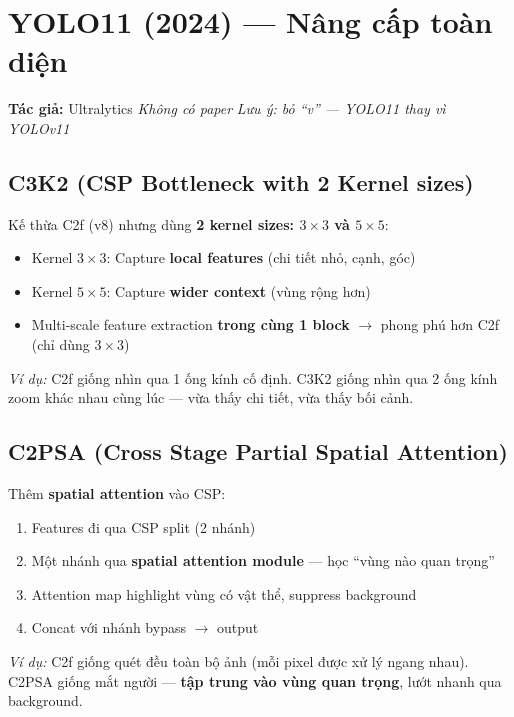 \section{YOLO11 (2024) --- Nâng cấp toàn diện}
\textbf{Tác giả:} Ultralytics \hfill \textit{Không có paper} \hfill \textit{Lưu ý: bỏ ``v'' --- YOLO11 thay vì YOLOv11}

\subsection{C3K2 (CSP Bottleneck with 2 Kernel sizes)}
Kế thừa C2f (v8) nhưng dùng \textbf{2 kernel sizes: $3\times3$ và $5\times5$}:
\begin{itemize}
    \item Kernel $3\times3$: Capture \textbf{local features} (chi tiết nhỏ, cạnh, góc)
    \item Kernel $5\times5$: Capture \textbf{wider context} (vùng rộng hơn)
    \item Multi-scale feature extraction \textbf{trong cùng 1 block} $\rightarrow$ phong phú hơn C2f (chỉ dùng $3\times3$)
\end{itemize}

\textit{Ví dụ:} C2f giống nhìn qua 1 ống kính cố định. C3K2 giống nhìn qua 2 ống kính zoom khác nhau cùng lúc --- vừa thấy chi tiết, vừa thấy bối cảnh.

\subsection{C2PSA (Cross Stage Partial Spatial Attention)}
Thêm \textbf{spatial attention} vào CSP:
\begin{enumerate}
    \item Features đi qua CSP split (2 nhánh)
    \item Một nhánh qua \textbf{spatial attention module} --- học ``vùng nào quan trọng''
    \item Attention map highlight vùng có vật thể, suppress background
    \item Concat với nhánh bypass $\rightarrow$ output
\end{enumerate}

\textit{Ví dụ:} C2f giống quét đều toàn bộ ảnh (mỗi pixel được xử lý ngang nhau). C2PSA giống mắt người --- \textbf{tập trung vào vùng quan trọng}, lướt nhanh qua background.


